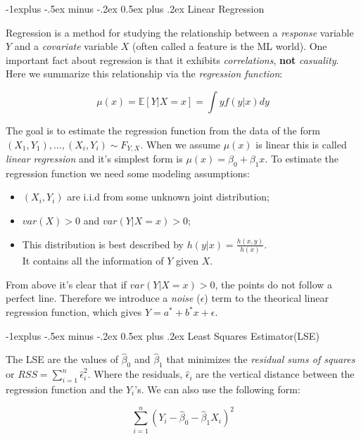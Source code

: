 \documentclass[landscape]{article}
\makeatletter
\renewcommand{\subsection}{\@startsection{subsection}{2}{0mm}%
                                {-1explus -.5ex minus -.2ex}%
                                {0.5ex plus .2ex}%
                                {\normalfont\normalsize\bfseries}}
\makeatother
\begin{document}
\begin{multicols}{3}
\subsection{Linear Regression}

Regression is a method for studying the relationship between a \emph{response} variable $Y$ and a \emph{covariate} variable $X$ (often called a feature is the ML world).
One important fact about regression is that it exhibits \emph{correlations}, \textbf{not} \emph{casuality}. 
Here we summarize this relationship via the \emph{regression function}:

$$\mu(x) = \mathbb{E}[Y | X = x] = \int y f(y|x) dy$$

The goal is to estimate the regression function from the data of the form $(X_1, Y_1), \dots, (X_i, Y_i) \sim F_{Y,X}$. 
When we assume $\mu(x)$ is linear this is called \emph{linear regression} and it's simplest form is $\mu(x) = \beta_0 + \beta_1 x$.
To estimate the regression function we need some modeling assumptions:

\begin{itemize}[itemsep=0em]
    \item $(X_i, Y_i)$ are i.i.d from some unknown joint distribution;
    \item $var(X) > 0$ and $var(Y | X = x) > 0$;
    \item This distribution is best described by $h(y|x) = \frac{h(x, y)}{h(x)}$.\\
          It contains all the information of $Y$ given $X$.
\end{itemize}

From above it's clear that if $var(Y | X = x) > 0$, the points do not follow a perfect line. Therefore we introduce a \emph{noise} ($\epsilon$) term to the 
theorical linear regression function, which gives $Y = a^* + b^* x + \epsilon$. 

\subsection{Least Squares Estimator(LSE)}

The LSE are the values of $\widehat{\beta}_0$ and $\widehat{\beta}_1$ that minimizes the \emph{residual sums of squares} or $RSS = \sum_{i = 1}^{n} \widehat{\epsilon}_i^2$.
Where the residuals, $\widehat{\epsilon}_i$ are the vertical distance between the regression function and the $Y_i$'s. We can also use the following form:

$$\sum_{i = 1}^{n} (Y_i - \widehat{\beta}_0 - \widehat{\beta}_1 X_i)^2$$


\end{multicols}
\end{document}
